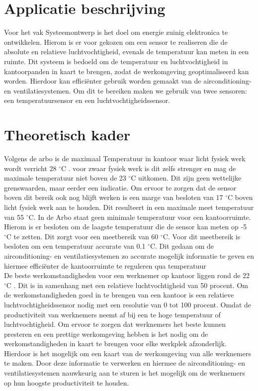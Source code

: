 \newpage
\section{Applicatie beschrijving}
Voor het vak Systeemontwerp is het doel om energie zuinig elektronica te ontwikkelen. Hierom is er voor gekozen om een sensor te realiseren die de absolute en relatieve luchtvochtigheid, evenals de temperatuur kan meten in een ruimte. Dit systeem is bedoeld om de temperatuur en luchtvochtigheid in kantoorpanden in kaart te brengen, zodat de werkomgeving geoptimaliseerd kan worden. Hierdoor kan efficiënter gebruik worden gemaakt van de airconditioning- en ventilatiesystemen. Om dit te bereiken maken we gebruik van twee sensoren: een temperatuursensor en een luchtvochtigheidssensor.
\section{Theoretisch kader}
\label{Theoretisch_kader}
Volgens de arbo is de maximaal Temperatuur in kantoor waar licht fysiek werk wordt verricht 28 $^\circ\text{C}$ \cite{ARBO_temperatuur_regels}. voor zwaar fysiek werk is dit zelfs strenger en mag de maximale temperatuur niet boven de 23 $^\circ\text{C}$ uitkomen. Dit zijn geen wettelijke grenswaarden, maar eerder een indicatie. Om ervoor te zorgen dat de sensor boven dit bereik ook nog blijft werken is een marge van besloten van 17 $^\circ\text{C}$ boven licht fysiek werk aan te houden. Dit resulteert in een maximale meet temperatuur van 55 $^\circ\text{C}$. In de Arbo staat geen minimale temperatuur voor een kantoorruimte. Hierom is er besloten om de laagste temperatuur die de sensor kan meten op -5 $^\circ\text{C}$ te zetten. Dit zorgt voor een meetbereik van 60 $^\circ\text{C}$. Voor dit meetbereik is besloten om een temperatuur accurate van 0.1 $^\circ\text{C}$. Dit gedaan om de airconditioning- en ventilatiesystemen zo accurate mogelijk informatie te geven en hiermee efficiënter de kantoorruimte te reguleren qua temperatuur
\newline
\\
De beste werkomstandigheden voor een werknemer op kantoor liggen rond de 22 $^\circ\text{C}$ \cite{Beste_werk_omstandigheden}. Dit is in samenhang met een relatieve luchtvochtigheid van 50 procent. Om de werkomstandigheden goed in te brengen van een kantoor is een relatieve luchtvochtigheidssensor nodig met een resolutie van 0 tot 100 procent. Omdat de productiviteit van werknemers neemt af bij een te hoge temperatuur of luchtvochtigheid. Om ervoor te zorgen dat werknemers het beste kunnen presteren en een prettige werkomgeving hebben is het nodig om de werkomstandigheden in kaart te brengen voor elke werkplek afzonderlijk. Hierdoor is het mogelijk om een kaart van de werkomgeving van alle werknemers te maken. Door deze informatie te verwerken en hiermee de airconditioning- en ventilatiesystemen nauwkeurig aan te sturen is het mogelijk om de werknemers op hun hoogste productiviteit te houden.
